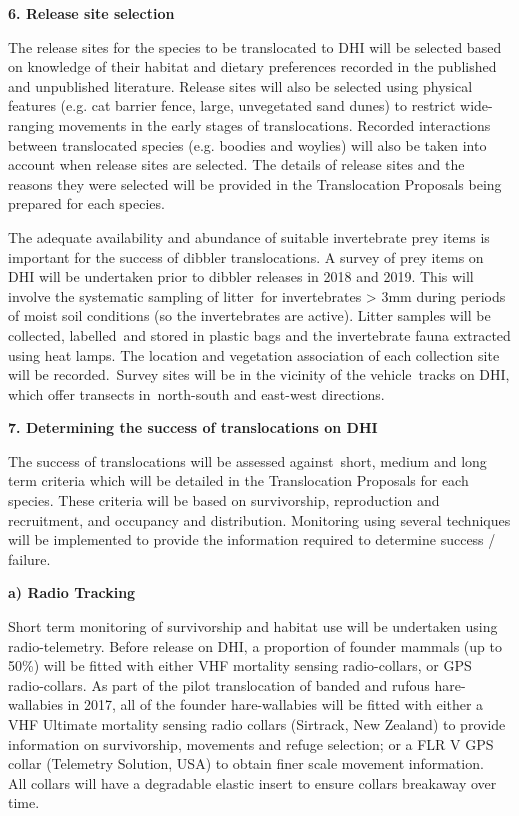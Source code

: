 \documentclass[version=last,
    paper=a4,                               %
    10pt,                                   %
    dvipsnames,
    oneside,                              %
    headings=openany,                       %
    open=any,
    BCOR=7mm,                               %
    DIV=15,     %
]{scrbook}
\begin{document}
\textbf{6. Release site selection}

The release sites for the species to be translocated to DHI will be
selected based on knowledge of their habitat and dietary preferences
recorded in the published and unpublished literature. Release sites will
also be selected using physical features (e.g. cat barrier fence, large,
unvegetated sand dunes) to restrict wide-ranging movements in the early
stages of translocations. Recorded interactions between translocated
species (e.g. boodies and woylies) will also be taken into account when
release sites are selected. The details of release sites and the reasons
they were selected will be provided in the Translocation Proposals being
prepared for each species.

The adequate availability and abundance of suitable invertebrate prey
items is important for the success of dibbler translocations. A survey
of prey items on DHI will be undertaken prior to dibbler releases in
2018 and 2019. This will involve the systematic sampling of litter~for
invertebrates \textgreater{} 3mm during periods of moist soil conditions
(so the invertebrates are active). Litter samples will be collected,
labelled~and stored in plastic bags and the invertebrate fauna extracted
using heat lamps. The location and vegetation association of each
collection site will be recorded.~Survey sites will be in the vicinity
of the vehicle~tracks on DHI, which offer transects in~north-south and
east-west directions.

\textbf{7. Determining the success of translocations on DHI}

The success of translocations will be assessed against~short, medium and
long term criteria which will be detailed in the Translocation Proposals
for each species. These criteria will be based on survivorship,
reproduction and recruitment, and occupancy and distribution. Monitoring
using several techniques will be implemented to provide the information
required to determine success / failure.

\textbf{a) Radio Tracking}

Short term monitoring of survivorship and habitat use will be undertaken
using radio-telemetry. Before release on DHI, a proportion of founder
mammals (up to 50\%) will be fitted with either VHF mortality sensing
radio-collars, or GPS radio-collars. As part of the pilot translocation
of banded and rufous hare-wallabies in 2017, all of the founder
hare-wallabies will be fitted with either a VHF Ultimate mortality
sensing radio collars (Sirtrack, New Zealand) to provide information on
survivorship, movements and refuge selection; or a FLR V GPS collar
(Telemetry Solution, USA) to obtain finer scale movement information.~
All collars will have a degradable elastic insert to ensure collars
breakaway over time.
\end{document}
